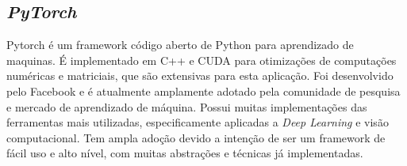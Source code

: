 \subsection{\textit{PyTorch}}\label{sec:Cap2_PyTorch}
Pytorch é um framework código aberto de Python para aprendizado de maquinas. É implementado em C++ e CUDA para otimizações de computações numéricas e matriciais, que são extensivas para esta aplicação.
Foi desenvolvido pelo Facebook e é atualmente amplamente adotado pela comunidade de pesquisa e mercado de aprendizado de máquina. Possui muitas implementações das ferramentas mais utilizadas, especificamente aplicadas a \textit{Deep Learning} e visão computacional. Tem ampla adoção devido a intenção de ser um framework de fácil uso e alto nível, com muitas abstrações e técnicas já implementadas.



